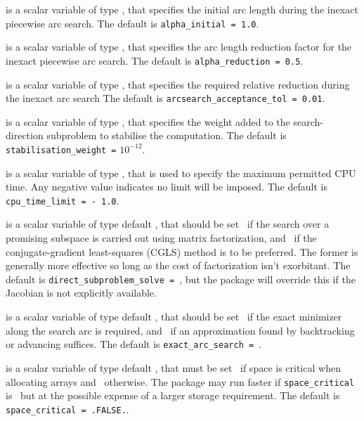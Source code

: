 \documentclass{galahad}
\begin{document}
\begin{description}
 is a scalar variable of type \realdp, that
specifies the initial arc length during the inexact piecewise arc search.
The default is {\tt alpha\_initial = 1.0}.

 is a scalar variable of type \realdp, that
specifies the arc length reduction factor for the inexact piecewise arc search.
The default is {\tt alpha\_reduction = 0.5}.

 is a scalar variable of type \realdp,
that specifies the required relative reduction during the inexact arc search
The default is {\tt arcsearch\_acceptance\_tol = 0.01}.

 is a scalar variable of type \realdp,
that specifies the weight added to the search-direction subproblem to 
stabilise the computation.
The default is {\tt stabilisation\_weight =} $10^{-12}$.

 is a scalar variable of type \realdp,
that is used to specify the maximum permitted CPU time. Any negative
value indicates no limit will be imposed. The default is
{\tt cpu\_time\_limit = - 1.0}.

 is a scalar variable of type default \logical,
that should be set \true\ if the search over a promising subspace is
carried out using matrix factorization, and \false\ if the conjugate-gradient
least-squares (CGLS) method is to be preferred. The former is generally
more effective so long as the cost of factorization isn't exorbitant.
The default is {\tt direct\_subproblem\_solve = \true}, but the
package will override this if the Jacobian is not explicitly available.

 is a scalar variable of type default \logical,
that should be set \true\ if the exact minimizer along the search arc is
required, and \false\ if an approximation found by backtracking or
advancing suffices.
The default is {\tt exact\_arc\_search = \true}.


 is a scalar variable of type default \logical,
that must be set \true\ if space is critical when allocating arrays
and  \false\ otherwise. The package may run faster if
{\tt space\_critical} is \false\ but at the possible expense of a larger
storage requirement. The default is {\tt space\_critical = .FALSE.}.


\end{description}
\end{document}

